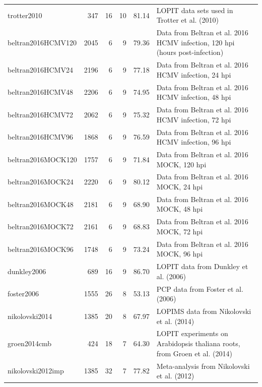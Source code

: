 \documentclass[12pt]{article}\usepackage[]{graphicx}\usepackage[]{color}
\begin{document}
\begin{footnotesize}
\begin{landscape}
\begin{longtable}{lrrrrp{8cm}}
  trotter2010 & 347 &  16 &  10 & 81.14 & LOPIT data sets used in Trotter et al. (2010) \citep{Trotter:2010} \\ 
  beltran2016HCMV120 & 2045 &   6 &   9 & 79.36 & Data from Beltran et al. 2016 \citep{JeanBeltran:2016} HCMV infection, 120 hpi (hours post-infection) \\ 
  beltran2016HCMV24 & 2196 &   6 &   9 & 77.18 & Data from Beltran et al. 2016 \citep{JeanBeltran:2016} HCMV infection, 24 hpi \\ 
  beltran2016HCMV48 & 2206 &   6 &   9 & 74.95 & Data from Beltran et al. 2016 \citep{JeanBeltran:2016} HCMV infection, 48 hpi \\ 
  beltran2016HCMV72 & 2062 &   6 &   9 & 75.32 & Data from Beltran et al. 2016 \citep{JeanBeltran:2016} HCMV infection, 72 hpi \\ 
  beltran2016HCMV96 & 1868 &   6 &   9 & 76.59 & Data from Beltran et al. 2016 \citep{JeanBeltran:2016} HCMV infection, 96 hpi \\ 
  beltran2016MOCK120 & 1757 &   6 &   9 & 71.84 & Data from Beltran et al. 2016 \citep{JeanBeltran:2016} MOCK, 120 hpi \\ 
  beltran2016MOCK24 & 2220 &   6 &   9 & 80.12 & Data from Beltran et al. 2016 \citep{JeanBeltran:2016} MOCK, 24 hpi \\ 
  beltran2016MOCK48 & 2181 &   6 &   9 & 68.90 & Data from Beltran et al. 2016 \citep{JeanBeltran:2016} MOCK, 48 hpi \\ 
  beltran2016MOCK72 & 2161 &   6 &   9 & 68.83 & Data from Beltran et al. 2016 \citep{JeanBeltran:2016} MOCK, 72 hpi \\ 
  beltran2016MOCK96 & 1748 &   6 &   9 & 73.24 & Data from Beltran et al. 2016 \citep{JeanBeltran:2016} MOCK, 96 hpi \\ 
  dunkley2006 & 689 &  16 &   9 & 86.70 & LOPIT data from Dunkley et al. (2006) \citep{Dunkley:2006} \\ 
  foster2006 & 1555 &  26 &   8 & 53.13 & PCP data from Foster et al. (2006) \citep{Foster:2006} \\ 
  nikolovski2014 & 1385 &  20 &   8 & 67.97 & LOPIMS data from Nikolovski et al. (2014) \citep{Nikolovski:2014} \\ 
  groen2014cmb & 424 &  18 &   7 & 64.30 & LOPIT experiments on Arabidopsis thaliana roots, from Groen et al. (2014) \citep{Groen:2014} \\ 
  nikolovski2012imp & 1385 &  32 &   7 & 77.82 & Meta-analysis from Nikolovski et al. (2012) \citep{Nikolovski:2012} \\ 

\end{longtable}
\end{landscape}
\end{footnotesize}
\end{document}
